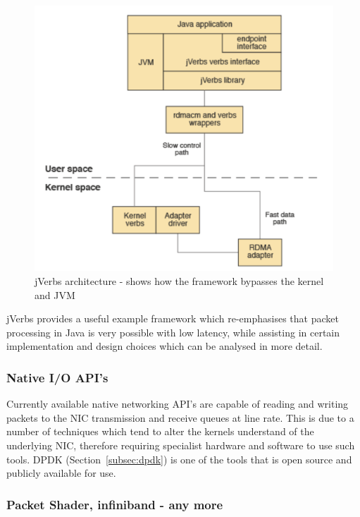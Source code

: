 \documentclass[final_report.tex]{subfiles}
\begin{document}
\begin{figure}[H]
	\centering
	\includegraphics[width=\textwidth]{img/jverbs.png}
	\caption{jVerbs architecture - shows how the framework bypasses the kernel and JVM \cite{ibm_jverbs}}
	\label{fig:jverb}
\end{figure}

jVerbs provides a useful example framework which re-emphasises that packet processing in Java is very possible with low latency, while assisting in certain implementation and design choices which can be analysed in more detail.

\subsubsection{Native I/O API's}
Currently available native networking API's are capable of reading and writing packets to the NIC transmission and receive queues at line rate. This is due to a number of techniques which tend to alter the kernels understand of the underlying NIC, therefore requiring specialist hardware and software to use such tools. DPDK (Section~\ref{subsec:dpdk}) is one of the tools that is open source and publicly available for use.

\subsubsection{Packet Shader, infiniband - any more}
\end{document}
